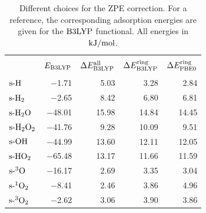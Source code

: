\documentclass[8.5pt,twoside,twocolumn]{article}
\newcommand\zpe{\enmat{\te{ZPE}}}
\newcommand\ering{\enmat{E^{\te{ring}}}}
\newcommand\eall{\enmat{E^{\te{all}}}}
\newcommand\zpering{\enmat{\zpe/\te{ring}}}
\newcommand\zpeall{\enmat{\zpe/\te{all}}}
\newcommand\eads{\enmat{E^{\te{ads}}}}
\newcommand\sur{\enmat{\te{s-}}}
\newcommand\tripo{\enmat{{^3\te{O}}}}
\newcommand\singot{\enmat{{^1\ot}}}
\newcommand\tripot{\enmat{{^3\ot}}}
\newcommand\kmo{\enmat{\te {kJ/mol}}}
\theoremstyle{standard}
\begin{document}
\begin{table}[htb]
  \caption{Different choices for the ZPE correction. For a reference, the corresponding 
  adsorption energies are given for the $\text{B3LYP}$ functional. All energies in $\kmo$.}
  \centering
    \begin{tabular}{l|rrrr}
       & & & & \\[-10pt]
     & $E_{\text{B3LYP}}$   & $\Dl\eall_{\btlyp}$ & $\Dl\ering_{\btlyp}$ & $\Dl\ering_{\pbez}$ \\[2pt]
    \hline
       & & & & \\[-10pt]
    $\sur\te{H}$ & $-$1.71 & 5.03  & 3.28  & 2.84 \\
    $\sur\htw$ & $-$2.65 & 8.42  & 6.80  & 6.81 \\
    $\sur\hto$ & $-$48.01 & 15.98 & 14.84 & 14.45 \\
    $\sur\htot$ & $-$41.76 & 9.28  & 10.09 & 9.51 \\
    $\sur\ho$ & $-$44.99 & 13.60 & 12.11 & 12.05 \\
    $\sur\hot$ & $-$65.48 & 13.17 & 11.66 & 11.59 \\
    $\sur\tripo$ & $-$16.17 & 2.69  & 3.35  & 3.04 \\
    $\sur\singot$ & $-$8.41 & 2.46  & 3.86  & 4.96 \\
    $\sur\tripot$ & $-$2.62 & 3.06  & 3.90  & 3.86 \\[2pt]
    \hline
    \end{tabular}%
  \label{Tab:Ads:AdsB3lyp}%
\end{table}%
\end{document}
